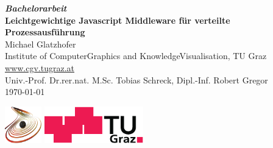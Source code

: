 \documentclass[10pt,a4paper,onecolumn]{book}
\newcommand{\wwwLink}[1]{\href{http://#1}{\textsf{#1}}}
\begin{document}
\frontmatter

\begin{titlepage}
\begin{center}
\vspace*{30mm}\Large

\textbf{\textit{Bachelorarbeit}}\\[12mm]

\textbf{\textsf{\huge Leichtgewichtige Javascript Middleware für verteilte Prozessausführung}}\\[5mm]


Michael Glatzhofer \\[6pt]
Institute of ComputerGraphics and KnowledgeVisualisation, TU Graz\\[6pt]
\wwwLink{www.cgv.tugraz.at}\\[3em]


Univ.-Prof. Dr.rer.nat. M.Sc. Tobias Schreck, Dipl.-Inf. Robert Gregor \\
\today


\vspace*{\fill}

\includegraphics[height=16mm]{cgv-logo} \quad
\includegraphics[height=16mm]{tug-logo}
\end{center}
\end{titlepage}

\tableofcontents

\mainmatter











\listoftables
{}
\listoffigures
{}
\twocolumn
\printindex
\end{document}
